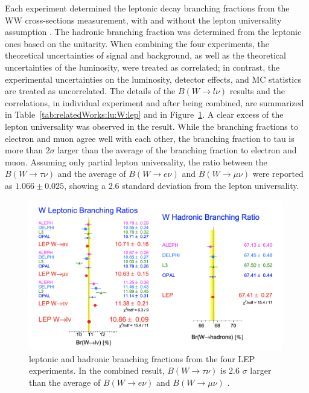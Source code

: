 Each experiment determined the leptonic \PW decay branching fractions from the WW cross-sections measurement, with and without the lepton universality assumption \cite{Schael:2013ita}. The hadronic branching fraction was determined from the leptonic ones based on the unitarity. When combining the four experiments, the theoretical uncertainties of signal and background, as well as the theoretical uncertainties of the luminosity, were treated as correlated; in contrast, the experimental uncertainties on the luminosity, detector effects, and MC statistics are treated as uncorrelated. The details of the $B(W\to l \nu)$ results and the correlations, in individual experiment and after being combined, are summarized in Table~\ref{tab:relatedWorks:lu:W:lep} and in Figure~\ref{fig:relatedWorks:lu:W:lep}. A clear excess of the lepton universality was observed in the result. While the branching fractions to electron and muon agree well with each other, the branching fraction to tau is more than $2 \sigma$ larger than the average of the branching fraction to electron and muon. Assuming only partial lepton universality, the ratio between the $B(W\to \tau \nu)$ and the average of $B(W\to e \nu)$ and $B(W\to \mu \nu)$ were reported as \cite{Schael:2013ita} $1.066 \pm 0.025$, showing a 2.6 standard deviation from the lepton universality.


\begin{figure}[ht]
    \centering
    \includegraphics[width=0.99\textwidth]{chapters/RelatedWorks/sectionLU/figures/lepResult.png}
    \caption{\PW leptonic and hadronic branching fractions from the four LEP experiments. In the combined result, $B(W\to \tau \nu)$  is 2.6 $\sigma$ larger than the average of $B(W\to e \nu)$ and $B(W\to \mu \nu)$ \cite{Schael:2013ita}. }
    \label{fig:relatedWorks:lu:W:lep}
\end{figure}

